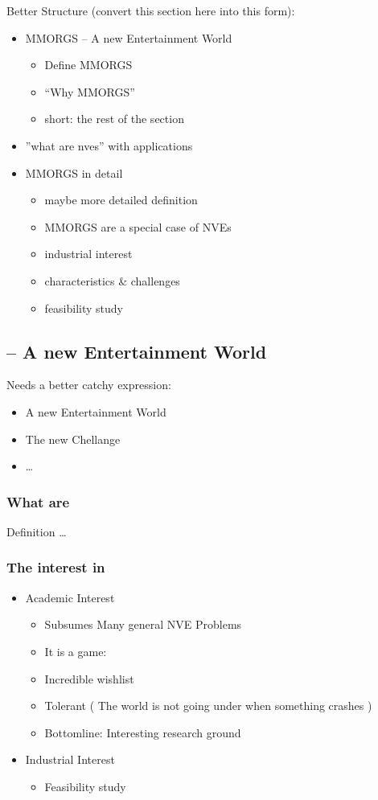 Better Structure (convert this section here into this form):
\begin{itemize}
	\item MMORGS -- A new Entertainment World
	\begin{itemize}
		\item Define MMORGS
		\item ``Why MMORGS''
		\item short: the rest of the section
	\end{itemize}
	\item ''what are nves'' with applications
	\item MMORGS in detail
	\begin{itemize}
		\item maybe more detailed definition
		\item MMORGS are a special case of NVEs
		\item industrial interest
  		\item characteristics \& challenges
		\item feasibility study
	\end{itemize}
\end{itemize}

\subsection{\MMORGS -- A new Entertainment World}
Needs a better catchy expression:
\begin{itemize}
	\item A new Entertainment World
	\item The new Chellange
	\item \dots
\end{itemize}

\subsubsection{What are \MMORGS}
Definition \ldots

\subsubsection{The interest in \MMORGS}
\begin{itemize}
	\item Academic Interest
	\begin{itemize}
		\item Subsumes Many general NVE Problems
		\item It is a game:
		\item Incredible wishlist
		\item Tolerant ( The world is not going under when something crashes )
		\item Bottomline: Interesting research ground
	\end{itemize}
	\item Industrial Interest
	\begin{itemize}
		\item Feasibility study
	\end{itemize}
\end{itemize}

